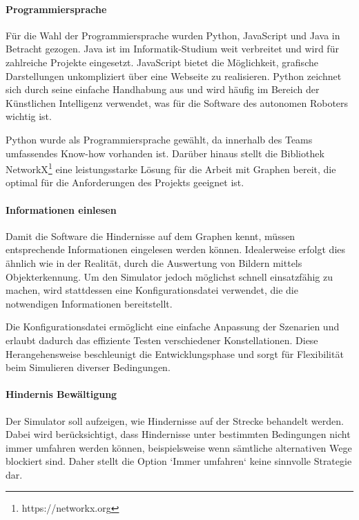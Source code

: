 \documentclass[../main.tex]{subfiles}
\begin{document}
\paragraph{Programmiersprache}

Für die Wahl der Programmiersprache wurden Python, JavaScript und Java in Betracht gezogen. Java ist im Informatik-Studium weit verbreitet und wird für zahlreiche Projekte eingesetzt. JavaScript bietet die Möglichkeit, grafische Darstellungen unkompliziert über eine Webseite zu realisieren. Python zeichnet sich durch seine einfache Handhabung aus und wird häufig im Bereich der Künstlichen Intelligenz verwendet, was für die Software des autonomen Roboters wichtig ist.

Python wurde als Programmiersprache gewählt, da innerhalb des Teams umfassendes Know-how vorhanden ist. Darüber hinaus stellt die Bibliothek NetworkX\footnote{https://networkx.org} eine leistungsstarke Lösung für die Arbeit mit Graphen bereit, die optimal für die Anforderungen des Projekts geeignet ist.

\paragraph{Informationen einlesen}

Damit die Software die Hindernisse auf dem Graphen kennt, müssen entsprechende Informationen eingelesen werden können. Idealerweise erfolgt dies ähnlich wie in der Realität, durch die Auswertung von Bildern mittels Objekterkennung. Um den Simulator jedoch möglichst schnell einsatzfähig zu machen, wird stattdessen eine Konfigurationsdatei verwendet, die die notwendigen Informationen bereitstellt.

Die Konfigurationsdatei ermöglicht eine einfache Anpassung der Szenarien und erlaubt dadurch das effiziente Testen verschiedener Konstellationen. Diese Herangehensweise beschleunigt die Entwicklungsphase und sorgt für Flexibilität beim Simulieren diverser Bedingungen.

\paragraph{Hindernis Bewältigung}

Der Simulator soll aufzeigen, wie Hindernisse auf der Strecke behandelt werden.
Dabei wird berücksichtigt, dass Hindernisse unter bestimmten Bedingungen nicht immer umfahren werden können, beispielsweise wenn sämtliche alternativen Wege blockiert sind. Daher stellt die Option `Immer umfahren` keine sinnvolle Strategie dar.
\end{document}
